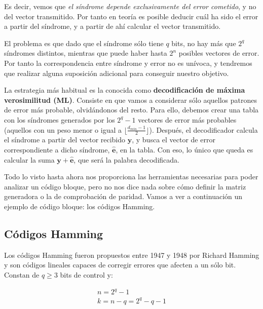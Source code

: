 \documentclass[es,apuntes]{uah}
\begin{document}
Es decir, vemos que \textit{el síndrome depende exclusivamente del error cometido}, y no del vector transmitido. Por tanto en teoría es posible deducir cuál ha sido el error a partir del síndrome, y a partir de ahí calcular el vector transmitido. 

El problema es que dado que el síndrome sólo tiene $q$ bits, no hay más que $2^q$ síndromes distintos, mientras que puede haber hasta $2^n$ posibles vectores de error. Por tanto la correspondencia entre síndrome y error no es unívoca, y tendremos que realizar alguna suposición adicional para conseguir nuestro objetivo. 

La estrategia más habitual es la conocida como {\bf decodificación de máxima verosimilitud (ML)}. Consiste en que vamos a considerar sólo aquellos patrones de error más probable, olvidándonos del resto. Para ello, debemos crear una tabla con los síndromes generados por los $2^q -1$ vectores de error más probables (aquellos con un peso menor o igual a $\lfloor \frac{d_{min}-1}{2} \rfloor$). Después, el decodificador calcula el síndrome a partir del vector recibido $\mathbf{y}$, y busca el vector de error correspondiente a dicho síndrome, $\hat{\mathbf{e}}$, en la tabla. Con eso, lo único que queda es calcular la suma $\mathbf{y} + \hat{\mathbf{e}}$, que será la palabra decodificada.


Todo lo visto hasta ahora nos proporciona las herramientas necesarias para poder analizar un código bloque, pero no nos dice nada sobre cómo definir la matriz generadora o la de comprobación de paridad. Vamos a ver a continuación un ejemplo de código bloque: los códigos Hamming.


\subsection{Códigos Hamming}

Los códigos Hamming fueron propuestos entre 1947 y 1948 por Richard Hamming y son códigos lineales capaces de corregir errores que afecten a un sólo bit. Constan de $q \geq 3$ bits de control y:

\begin{displaymath}
	\begin{array}{l}
		n = 2^q - 1 \\
		k = n-q = 2^q -q -1
	\end{array}
\end{displaymath}
\end{document}
